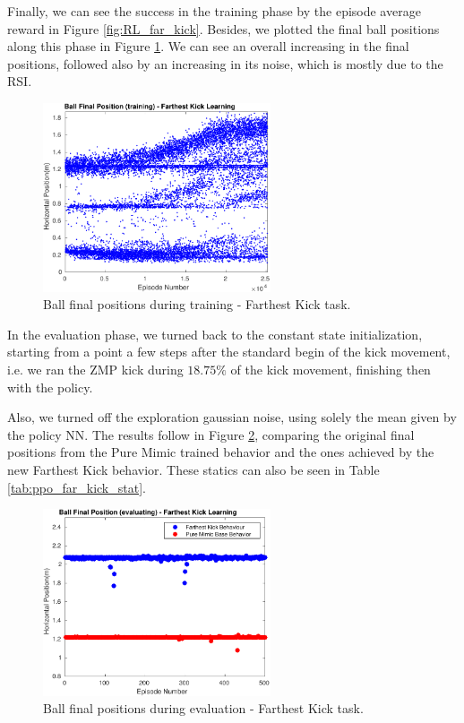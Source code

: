 Finally, we can see the success in the training phase by the episode average reward in Figure \ref{fig:RL_far_kick}. Besides, we plotted the final ball positions along this phase in Figure \ref{fig:RL_far_kick_pos_train}. We can see an overall increasing in the final positions, followed also by an increasing in its noise, which is mostly due to the RSI.

\begin{figure}[H]
    \centering
    \includegraphics[width=0.6\textwidth]{Chapter7/plots/plot_ball_pos_far_kick_train.pdf} 
    \caption{Ball final positions during training - Farthest Kick task.}
    \label{fig:RL_far_kick_pos_train}
\end{figure}

In the evaluation phase, we turned back to the constant state initialization, starting from a point a few steps after the standard begin of the kick movement, i.e. we ran the ZMP kick during $18.75\%$ of the kick movement, finishing then with the policy.

Also, we turned off the exploration gaussian noise, using solely the mean given by the policy NN. The results follow in Figure \ref{fig:RL_far_kick_pos_eval}, comparing the original final positions from the Pure Mimic trained behavior and the ones achieved by the new Farthest Kick behavior. These statics can also be seen in Table \ref{tab:ppo_far_kick_stat}.

\begin{figure}[H]
    \centering
    \includegraphics[width=0.6\textwidth]{Chapter7/plots/plot_ball_pos_far_kick_eval.pdf} 
    \caption{Ball final positions during evaluation - Farthest Kick task.}
    \label{fig:RL_far_kick_pos_eval}
\end{figure}

